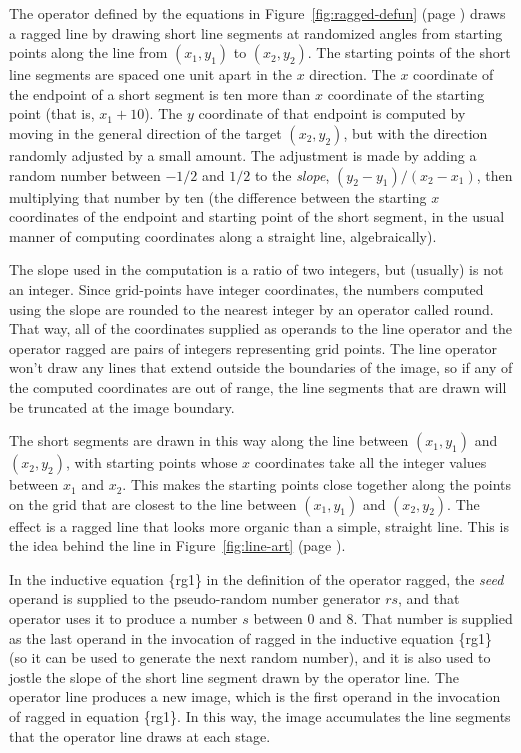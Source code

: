 The operator defined by the equations in
Figure~\ref{fig:ragged-defun} (page \pageref{fig:ragged-defun})
draws a ragged line
by drawing short line segments at randomized angles
from starting points along the line from $(x_1,y_1)$ to $(x_2,y_2)$.
The starting points of the short line segments are
spaced one unit apart in the $x$ direction.
The $x$ coordinate of the endpoint of a short segment
is ten more than $x$ coordinate of the starting point
(that is, $x_1 + 10$).
The $y$ coordinate of that endpoint is computed
by moving in the general direction of the target
$(x_2,y_2)$, but with the direction 
randomly adjusted by a small amount.
The adjustment is made by adding a random number between
$-1/2$ and $1/2$ to the \emph{slope},
$(y_2 - y_1)/(x_2 - x_1)$, then multiplying that
number by ten (the difference between the
starting $x$ coordinates of the endpoint
and starting point of the short segment,
in the usual manner of computing coordinates
along a straight line, algebraically).

The slope used in the computation is a ratio of
two integers, but (usually) is not an integer.
Since grid-points have integer coordinates,
the numbers computed using the slope
are rounded to the nearest integer by
an operator called \textsf{round}. That way,
all of the coordinates supplied as 
operands to the \textsf{line} operator
and the operator \textsf{ragged} are pairs of
integers representing grid points.
The \textsf{line} operator won't draw any lines
that extend outside the boundaries of
the image, so if any of the computed 
coordinates are out of range, 
the line segments that are drawn will
be truncated at the image boundary.

The short segments are drawn in this way along
the line between $(x_1,y_1)$ and $(x_2,y_2)$,
with starting points whose $x$ coordinates
take all the integer values between $x_1$ and $x_2$.
This makes the starting points close together along
the points on the grid that are closest to the
line between $(x_1,y_1)$ and $(x_2,y_2)$.
The effect is a ragged line that looks more organic 
than a simple, straight line.
This is the idea behind the line
in Figure~\ref{fig:line-art} (page \pageref{fig:line-art}).

In the inductive equation \{rg1\} in the definition of the operator \textsf{ragged},
the \emph{seed} operand is supplied to the pseudo-random
number generator $rs$, and that operator uses it to produce
a number $s$ between 0 and 8. That number is supplied as the last
operand in the invocation of \textsf{ragged} in the inductive equation \{rg1\}
(so it can be used to generate the next random number),
and it is also used to jostle 
the slope of the short line segment drawn by the operator \textsf{line}.
The operator \textsf{line} produces a new image,
which is the first operand in the invocation of \textsf{ragged} in equation \{rg1\}.
In this way, the image accumulates the line segments that the operator \textsf{line}
draws at each stage.


